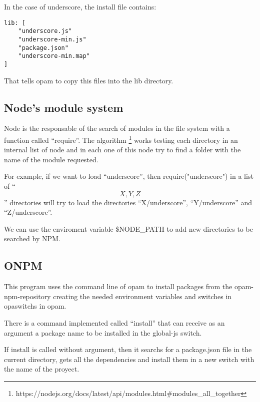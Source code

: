 \documentclass[letterpaper,12pt]{report}
\begin{document}
In the case of underscore, the install file contains:

\begin{verbatim}
lib: [
    "underscore.js" 
    "underscore-min.js"
    "package.json"
    "underscore-min.map"
]
\end{verbatim}

That tells opam to copy this files into the lib directory.


\subsection{Node's module system}

Node is the responsable of the search of modules in the file system with a
function called ``require''. The algorithm
\footnote{https://nodejs.org/docs/latest/api/modules.html\#modules\_all\_together}
works testing each directory in an internal list of node and in each one of this
node try to find a folder with the name of the module requested.

For example, if we want to load ``underscore'', then require("underscore") in a
list of ``\[X, Y, Z\]'' directories will try to load the directories
``X/underscore'', ``Y/underscore'' and ``Z/underscore''.

We can use the enviroment variable \$NODE\_PATH to add new directories to be
searched by NPM.

\subsection{ONPM}

This program uses the command line of opam to install packages from the
opam-npm-repository creating the needed environment variables and switches in
opaswitchs in opam.

There is a command implemented called ``install'' that can receive as an
argument a package name to be installed in the global-js switch.

If install is called without argument, then it searchs for a package.json file
in the current directory, gets all the dependencies and install them in a new
switch with the name of the proyect.
\end{document}
